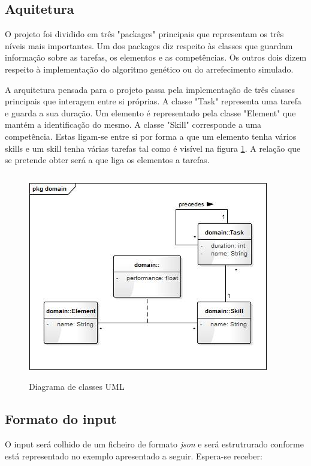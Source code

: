 \begin{titlepage}
\subsection{Aquitetura}
\justify\normalsize
O projeto foi dividido em três "packages" principais que representam os três níveis mais importantes. Um dos packages diz respeito às classes que guardam informação sobre as tarefas, os elementos e as competências. Os outros dois dizem respeito à implementação do algoritmo genético ou do arrefecimento simulado.

A arquitetura pensada para o projeto passa pela implementação de três classes principais que interagem entre si próprias. A classe "Task" representa uma tarefa e guarda a sua duração. Um elemento é representado pela classe "Element" que mantém a identificação do mesmo. A classe "Skill" corresponde a uma competência. Estas ligam-se entre si por forma a que um elemento tenha vários skills e um skill tenha várias tarefas tal como é visível na figura \ref{uml}. A relação que se pretende obter será a que liga os elementos a tarefas.

\begin{figure}[h!]
  \centering
    \includegraphics[width=10.5cm, height = 9cm]{uml.jpg}
  \caption{Diagrama de classes UML}
  \label{uml}
\end{figure}

\newpage

\subsection{Formato do input}

O input será colhido de um ficheiro de formato \textit{json} e será estrutrurado conforme está representado no exemplo apresentado a seguir. Espera-se receber:


\end{titlepage}
